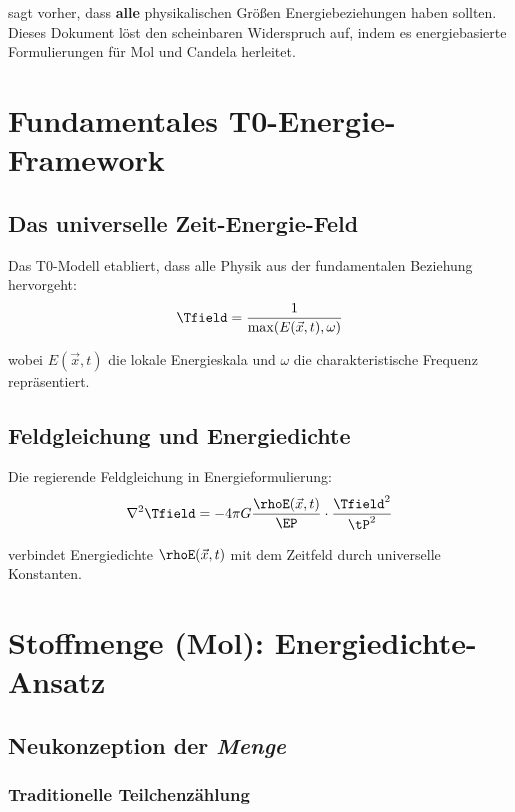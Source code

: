 	sagt vorher, dass \textbf{alle} physikalischen Größen Energiebeziehungen haben sollten. Dieses Dokument löst den scheinbaren Widerspruch auf, indem es energiebasierte Formulierungen für Mol und Candela herleitet.
	
	\section{Fundamentales T0-Energie-Framework}
	\label{sec:t0_framework}
	
	\subsection{Das universelle Zeit-Energie-Feld}
	\label{subsec:universelles_zeit_energie}
	
	Das T0-Modell etabliert, dass alle Physik aus der fundamentalen Beziehung hervorgeht:
	\begin{equation}
		\Tfield = \frac{1}{\max(E(\vec{x},t), \omega)}
		\label{eq:t0_zeitfeld}
	\end{equation}
	
	wobei $E(\vec{x},t)$ die lokale Energieskala und $\omega$ die charakteristische Frequenz repräsentiert.
	
	\subsection{Feldgleichung und Energiedichte}
	\label{subsec:feldgleichung}
	
	Die regierende Feldgleichung in Energieformulierung:
	\begin{equation}
		\nabla^2 \Tfield = -4\pi G \frac{\rhoE(\vec{x},t)}{\EP} \cdot \frac{\Tfield^2}{\tP^2}
		\label{eq:t0_feldgleichung}
	\end{equation}
	
	verbindet Energiedichte $\rhoE(\vec{x},t)$ mit dem Zeitfeld durch universelle Konstanten.
	
	\section{Stoffmenge (Mol): Energiedichte-Ansatz}
	\label{sec:mol_herleitung}
	
	\subsection{Neukonzeption der \textit{Menge}}
	\label{subsec:neukonzeption_menge}
	
	\subsubsection{Traditionelle Teilchenzählung}
	\label{subsubsec:traditionelle_zaehlung}
	
